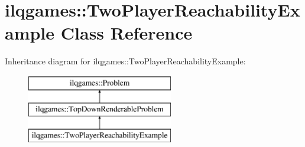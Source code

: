 \hypertarget{classilqgames_1_1_two_player_reachability_example}{}\section{ilqgames\+:\+:Two\+Player\+Reachability\+Example Class Reference}
\label{classilqgames_1_1_two_player_reachability_example}
Inheritance diagram for ilqgames\+:\+:Two\+Player\+Reachability\+Example\+:\begin{figure}[H]
\begin{center}
\leavevmode
\includegraphics[height=3.000000cm]{classilqgames_1_1_two_player_reachability_example}
\end{center}
\end{figure}
